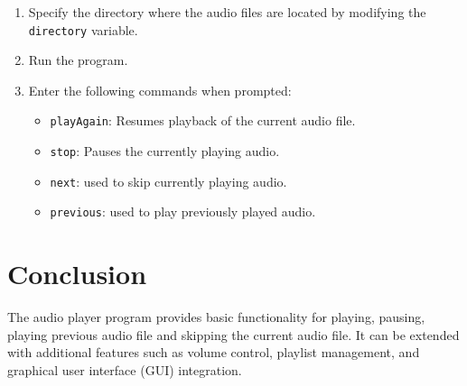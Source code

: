 \documentclass{article}
\begin{document}
\begin{enumerate}
  \item Specify the directory where the audio files are located by modifying the \texttt{directory} variable.
  \item Run the program.
  \item Enter the following commands when prompted:
  \begin{itemize}
    \item \texttt{playAgain}: Resumes playback of the current audio file.
    \item \texttt{stop}: Pauses the currently playing audio.
    \item \texttt{next}: used to skip currently playing audio.
    \item \texttt{previous}: used to play previously played audio. 

  \end{itemize}
\end{enumerate}

\section{Conclusion}
The audio player program provides basic functionality for playing, pausing, playing previous audio file and skipping the current audio file. It can be extended with additional features such as volume control, playlist management, and graphical user interface (GUI) integration.
\end{document}
